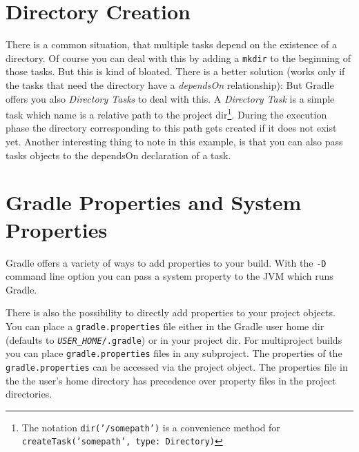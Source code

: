 \section{Directory Creation} %
\label{sec:directory_creation}
There is a common situation, that multiple tasks depend on the existence of a directory. Of course you can deal with this by adding a \texttt{mkdir} to the beginning of those tasks. But this is kind of bloated. 
There is a better solution (works only if the tasks that need the directory have a \emph{dependsOn} relationship):
But Gradle offers you also \emph{Directory Tasks} to deal with this.
A \emph{Directory Task} is a simple task which name is a relative path to the project dir\footnote{The notation \texttt{dir('/somepath')} is a convenience method for \texttt{createTask('somepath', type: Directory)}}. During the execution phase the directory corresponding to this path gets created if it does not exist yet. Another interesting thing to note in this example, is that you can also pass tasks objects to the dependsOn declaration of a task.

\section{Gradle Properties and System Properties} %
\label{sec:gradle_properties_and_system_properties}
Gradle offers a variety of ways to add properties to your build. With the \texttt{-D} command line option you can pass a system property to the JVM which runs Gradle. 

There is also the possibility to directly add properties to your project objects. You can place a \texttt{gradle.properties} file either in the Gradle user home dir (defaults to \texttt{\emph{USER\_HOME}/.gradle}) or in your project dir. For multiproject builds you can place \texttt{gradle.properties} files in any subproject. The properties of the \texttt{gradle.properties} can be accessed via the project object. The properties file in the the user's home directory has precedence over property files in the project directories. 

